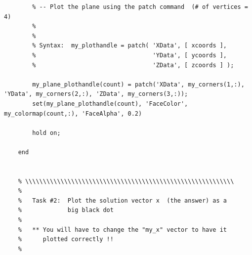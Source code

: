 \documentclass{article}
\begin{document}
\begin{verbatim}
        % -- Plot the plane using the patch command  (# of vertices = 4)
        %
        %
        % Syntax:  my_plothandle = patch( 'XData', [ xcoords ],
        %                                 'YData', [ ycoords ],
        %                                 'ZData', [ zcoords ] );
    
        my_plane_plothandle(count) = patch('XData', my_corners(1,:), 'YData', my_corners(2,:), 'ZData', my_corners(3,:));
        set(my_plane_plothandle(count), 'FaceColor', my_colormap(count,:), 'FaceAlpha', 0.2)
    
        hold on;
    
    end
    
    
    % \\\\\\\\\\\\\\\\\\\\\\\\\\\\\\\\\\\\\\\\\\\\\\\\\\\\\\\\\\\
    %
    %   Task #2:  Plot the solution vector x  (the answer) as a
    %             big black dot
    %
    %   ** You will have to change the "my_x" vector to have it
    %      plotted correctly !!
    %

\end{verbatim}
\end{document}
